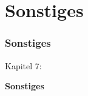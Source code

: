 %

\section{Sonstiges}
\begin{frame}[fragile]
	\frametitle{Sonstiges}

	\begin{center}\huge{Kapitel 7:}\end{center}
	\begin{center}\huge{\color{typo3darkgrey}\textbf{Sonstiges}}\end{center}

\end{frame}

